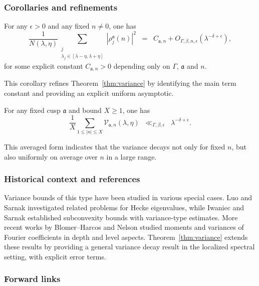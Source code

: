 \subsubsection{Corollaries and refinements}

\begin{corollary}\label{cor:uniform}
For any $\epsilon > 0$ and any fixed $n \neq 0$, one has
\[
\frac{1}{N(\lambda,\eta)} \sum_{\substack{j \\ \lambda_j \in [\lambda-\eta,\lambda+\eta]}}
|\rho_j^\mathfrak{a}(n)|^2 \;\;=\;\; C_{\mathfrak{a},n} + O_{\Gamma,\beta,n,\epsilon}(\lambda^{-\delta+\epsilon}),
\]
for some explicit constant $C_{\mathfrak{a},n} > 0$ depending only on $\Gamma$, $\mathfrak{a}$ and $n$.
\end{corollary}

This corollary refines Theorem~\ref{thm:variance} by identifying the main term constant and providing an explicit uniform asymptotic.

\begin{corollary}\label{cor:avg_n}
For any fixed cusp $\mathfrak{a}$ and bound $X \geq 1$, one has
\[
\frac{1}{X} \sum_{1 \leq |n| \leq X} \mathcal{V}_{\mathfrak{a},n}(\lambda,\eta) \;\;\ll_{\Gamma,\beta,\epsilon}\;\; \lambda^{-\delta+\epsilon}.
\]
\end{corollary}

This averaged form indicates that the variance decays not only for fixed $n$, but also uniformly on average over $n$ in a large range.

\subsubsection{Historical context and references}

Variance bounds of this type have been studied in various special cases. Luo and Sarnak \cite{LuoSarnak1995} investigated related problems for Hecke eigenvalues, while Iwaniec and Sarnak \cite{IwaniecSarnak1995} established subconvexity bounds with variance-type estimates. More recent works by Blomer–Harcos \cite{BlomerHarcos2008} and Nelson \cite{Nelson2015} studied moments and variances of Fourier coefficients in depth and level aspects. Theorem~\ref{thm:variance} extends these results by providing a general variance decay result in the localized spectral setting, with explicit error terms.

\subsubsection{Forward links}


